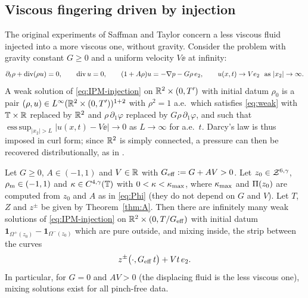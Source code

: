 \subsection{Viscous fingering driven by injection}
The original experiments of Saffman and Taylor \cite{ST58} concern a less viscous fluid injected into a more viscous one, without gravity. Consider the problem with gravity constant $G\ge0$ and a uniform
velocity $V\ee$ at infinity:
\begin{equation}\label{eq:IPM-injection}
\partial_t\rho+\operatorname{div}(\rho u)=0,\qquad \operatorname{div} u=0,\qquad (1+A\rho)u=-\nabla p-G\rho\,e_2,\qquad u(x,t)\to Ve_2\ \text{ as }|x_2|\to\infty .
\end{equation}
A weak solution of \eqref{eq:IPM-injection} on $\mathbb{R}^2\times(0,T')$ with initial datum $\rho_0$ is a pair $(\rho,u)\in L^\infty(\mathbb{R}^2\times(0,T'))^{1+2}$ with $\rho^2=1$ a.e.\ which satisfies \eqref{eq:weak}
with $\mathbb{T}\times\mathbb{R}$ replaced by $\mathbb{R}^2$ and $\rho\,\partial_1\varphi$ replaced by $G\rho\,\partial_1\varphi$, and such that $\operatorname{ess\,sup}_{|x_2|>L}|u(x,t)-V\ee|\to0$ as $L\to\infty$ for a.e.\ $t$.
Darcy's law is thus imposed in curl form; since $\mathbb{R}^2$ is simply connected, a pressure can then be recovered distributionally, as in \cite[Sec.~7.4]{LM26}.

\begin{corollary}\label{cor:injection-precise}
Let $G\ge0$, $A\in(-1,1)$ and $V\in\mathbb{R}$ with $G_{\rm eff}:=G+AV>0$. Let $z_0\in\mathcal{Z}^{6,\gamma}$, $\rho_{\mathrm m}\in(-1,1)$ and $\kappa\in C^{4,\gamma}(\mathbb{T})$ with $0<\kappa<\kappa_{\max}$, where $\kappa_{\max}$ and $\Pi(z_0)$ are computed
from $z_0$ and $A$ as in \eqref{eq:Phi} (they do not depend on $G$ and $V$). Let $T$, $Z$ and $z^\pm$ be given by Theorem~\ref{thm:A}. Then there are infinitely many weak solutions of
\eqref{eq:IPM-injection} on $\mathbb{R}^2\times(0,T/G_{\rm eff})$ with initial datum $\mathbf 1_{\Omega^+(z_0)}-\mathbf 1_{\Omega^-(z_0)}$ which are pure outside, and mixing inside, the strip between the curves
\[
z^\pm\big(\cdot,G_{\rm eff}\,t\big)+Vt\,e_2 .
\]
In particular, for $G=0$ and $AV>0$ (the displacing fluid is the less viscous one), mixing solutions exist for all pinch-free data.
\end{corollary}

